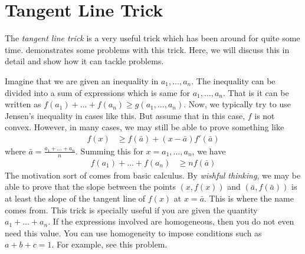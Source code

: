 \documentclass[inequalities.tex]{subfile}
\begin{document}
	
	\section{Tangent Line Trick}\label{sec:tangent}
	The \textit{tangent line trick} is a very useful trick which has been around for quite some time. \textcite{li_2006} demonstrates some problems with this trick. Here, we will discuss this in detail and show how it can tackle problems.
	
	Imagine that we are given an inequality in $a_{1},\ldots,a_{n}$. The inequality can be divided into a sum of expressions which is same for $a_{1},\ldots,a_{n}$. That is it can be written as $f(a_{1})+\ldots+f(a_{n})\geq g(a_{1},\ldots,a_{n})$. Now, we typically try to use Jensen's inequality in cases like this. But assume that in this case,  $f$ is not convex. However, in many cases, we may still be able to prove something like
		\begin{align*}
			f(x)
				& \geq f(\bar{a})+(x-\bar{a})f'(\bar{a})
		\end{align*}
	where $\bar{a}=\frac{a_{1}+\ldots+a_{n}}{n}$. Summing this for $x=a_{1},\ldots,a_{n}$, we have
		\begin{align*}
			f(a_{1})+\ldots+f(a_{n})
				& \geq nf(\bar{a})
		\end{align*}
	The motivation sort of comes from basic calculus. By \textit{wishful thinking}, we may be able to prove that the slope between the points $(x,f(x))$ and $(\bar{a},f(\bar{a}))$ is at least the slope of the tangent line of $f(x)$ at $x=\bar{a}$. This is where the name comes from. This trick is specially useful if you are given the quantity $a_{1}+\ldots+a_{n}$. If the expressions involved are homogeneous, then you do not even need this value. You can use homogeneity to impose conditions such as $a+b+c=1$. For example, see this problem.
\end{document}
